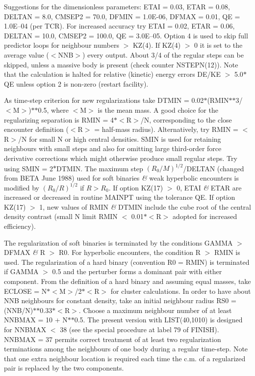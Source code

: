   Suggestions for the dimensionless parameters: ETAI = 0.03, ETAR = 0.08,
   DELTAN = 8.0, CMSEP2 = 70.0, DFMIN = 1.0E-06, DFMAX = 0.01,
   QE = 1.0E--04 (per TCR).  For increased accuracy try ETAI = 0.02,
 ETAR = 0.06, DELTAN = 10.0, CMSEP2 = 100.0, QE = 3.0E--05.  Option 4 is used to skip
 full predictor loops for neighbour numbers $>$ KZ(4).  If KZ(4) $>$ 0 it is
 set to the average value ($<$NNB$>$) every output.  About 3/4 of the regular 
 steps can be skipped, unless a massive body is present (check counter 
 NSTEPN(12)).  Note that the calculation is halted for relative (kinetic) energy
 errors DE/KE $>$ 5.0$\ast$QE unless option 2 is non-zero (restart facility).

  As time-step criterion for new regularizations take
 DTMIN = 0.02$\ast$(RMIN$\ast$$\ast$3/ $<$M$>$)$\ast$$\ast$0.5, where $<$M$>$  
is the mean mass.  A good
 choice for the regularizing separation is RMIN = 4$\ast$$<$R$>$/N, corresponding
 to the close encounter definition ($<$R$>$ = half-mass radius).  Alternatively,
 try RMIN = $<$R$>$/N for small N or high central densities.  SMIN
 is used for retaining neighbours with small steps and also for
 omitting large third-order force derivative corrections which might
 otherwise produce small regular steps.  Try using
 SMIN = 2$\ast$DTMIN.  The
 maximum step $(R_0/M)^{1/2}$/DELTAN (changed from BETA June 1988)
 used for soft binaries {\it \&} weak hyperbolic encounters is
 modified by $(R_0/R)^{1/2}$ if $R > R_0$.  If
 option KZ(17) $>$ 0, ETAI {\it\&} ETAR are increased or 
 decreased in routine MAINPT using the tolerance QE.  If option KZ(17) $>$ 1,  
 new values of RMIN {\it\&} DTMIN 
 include the cube root of the central density contrast (small N
 limit RMIN $<$ 0.01$\ast$$<$R$>$ adopted for increased efficiency).

 The regularization of soft binaries is terminated by the conditions
 GAMMA $>$ DFMAX {\it\&} R $>$ R0.  For hyperbolic encounters, the  
 condition R $>$ RMIN is used.  The regularization
 of a hard binary (convention R0 = RMIN) is terminated if 
 GAMMA $>$ 0.5 and the perturber forms a dominant pair with
 either component.  From the definition of a hard binary and assuming 
 equal masses, take ECLOSE =
 N$\ast$$<$M$>$/2$\ast$$<$R$>$ for cluster calculations.  In
 order to have about NNB neighbours for constant density, take an initial
 neighbour radius RS0 = (NNB/N)$\ast$$\ast$0.33$\ast$$<$R$>$.  
 Choose a maximum neighbour number of at least
 NNBMAX = 10 + N$\ast$$\ast$0.5.  The present version with
 LIST(40,1010) is designed for NNBMAX $<$ 38 (see the special procedure at label 
 79 of FINISH).  NNBMAX = 37 permits correct treatment of at least two
 regularization terminations among the neighbours of one body during a regular
 time-step.  Note that one extra neighbour location is required each time the
 c.m. of a regularized pair is replaced by the two components.

